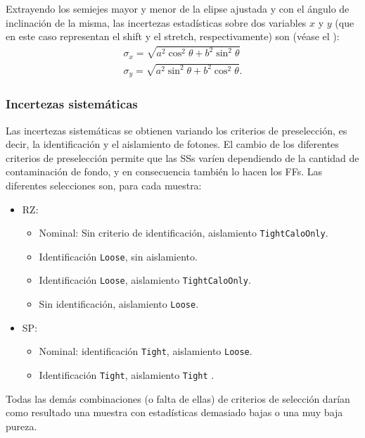 Extrayendo los semiejes mayor y menor de la elipse ajustada y con el ángulo de inclinación de la misma, las incertezas estadísticas sobre dos variables \(x\) y \(y\) (que en este caso representan el shift y el stretch, respectivamente) son (véase el \App{\ref{app:ellipse_formulae}}):
\begin{gather}
    \sigma_x = \sqrt{a^2 \cos^2\theta + b^2 \sin^2\theta}\\
    \sigma_y = \sqrt{a^2 \sin^2\theta + b^2 \cos^2\theta}.
\end{gather}

\subsubsection{Incertezas sistemáticas}

Las incertezas sistemáticas se obtienen variando los criterios de preselección, es decir, la identificación y el aislamiento de fotones. El cambio de los diferentes criterios de preselección permite que las \acp{SS} varíen dependiendo de la cantidad de contaminación de fondo, y en consecuencia también lo hacen los \acp{FF}.
Las diferentes selecciones son, para cada muestra:
\begin{itemize}
    \item \acf{RZ}:
        \begin{itemize}
            \item Nominal: Sin criterio de identificación, aislamiento \texttt{TightCaloOnly}.
            \item Identificación \texttt{Loose}, sin aislamiento.
            \item Identificación \texttt{Loose}, aislamiento \texttt{TightCaloOnly}.
            \item Sin identificación, aislamiento \texttt{Loose}.
        \end{itemize}
    \item \acf{SP}:
        \begin{itemize}
            \item Nominal: identificación \texttt{Tight}, aislamiento \texttt{Loose}.
            \item Identificación \texttt{Tight}, aislamiento \texttt{Tight} .
        \end{itemize}
\end{itemize}
Todas las demás combinaciones (o falta de ellas) de criterios de selección darían como resultado una muestra con estadísticas demasiado bajas o una muy baja pureza.

